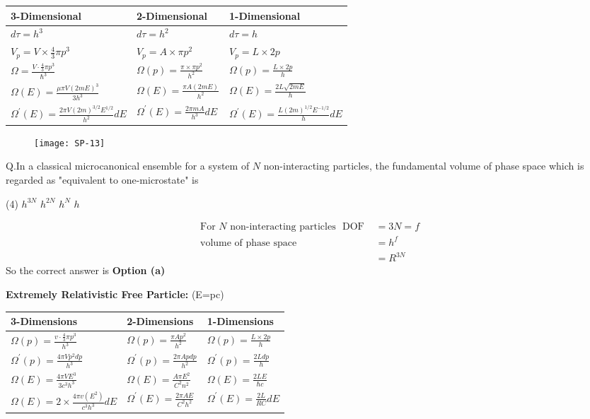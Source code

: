  \begin{tabular}{|p{4cm}|p{4cm}|p{4cm}|}
 	\hline
 3-Dimensional&2-Dimensional&1-Dimensional\\\hline
 $d \tau=h^{3}$&$d \tau=h^{2}$&$d \tau=h$\\\hline
 $V_{p}=V \times \frac{4}{3} \pi p^{3}$&$V_{p}=A \times \pi p^{2}$&$V_p=L\times2p$\\\hline
 $\Omega=\frac{V \cdot \frac{4}{3} \pi p^{3}}{\hbar^{3}}$&$\Omega(p)=\frac{\pi \times \pi p^{2}}{h^{2}}$&$\Omega(p)=\frac{L \times 2 p}{h}$\\\hline
 $\Omega(E)=\frac{\mu\pi V(2mE)^3}{3h^3}$&$\Omega(E)=\frac{\pi A(2mE)}{h^2}$&$\Omega(E)=\frac{2L\sqrt{2mE}}{h}$\\\hline
 $\Omega^{\prime}(E)=\frac{2 \pi V(2 m)^{3 / 2} E^{1 / 2}}{h^2}dE$&$\Omega^{\prime}(E)=\frac{2 \pi mA}{h^3}dE$&$\Omega^{\prime}(E)=\frac{L(2m)^{1/2}E^{-1/2}}{h}dE$\\\hline
 \end{tabular}
\begin{figure}[H]
	\texttt{[image: SP-13]}
\end{figure}
Q.In a classical microcanonical ensemble for a system of $N$ non-interacting particles, the fundamental volume of phase space which is regarded as "equivalent to one-microstate" is 
 \begin{tasks}(4)
	\task[\textbf{a.}] $h^{3 N}$
	\task[\textbf{b.}]$h^{2 N}$
	\task[\textbf{c.}]$h^{N}$
	\task[\textbf{d.}]$h$
\end{tasks}
\begin{answer}
	\begin{align*}
	\text{For $N$ non-interacting particles }\text { DOF }&=3 N=f\\
	\text{volume of phase space }&=h^{f}\\
	&=R^{3 N}
	\end{align*}
	So the correct answer is \textbf{Option (a)}
\end{answer}
\textbf{Extremely Relativistic Free Particle: }(E=pc)\\
\renewcommand*{\arraystretch}{1.8}
\begin{tabular}{|p{4cm}|p{4cm}|p{4cm}|}
	\hline
	3-Dimensions & 2-Dimensions & 1-Dimensions\\\hline
	$\Omega(p)=\frac{v \cdot \frac{4}{3} \pi p^{3}}{h^{3}}$&$\Omega(p)=\frac{\pi A p^{2}}{h^{2}}$&$\Omega(p)=\frac{L \times 2 p}{h}$\\
	$\Omega^{\prime}(p)=\frac{4 \pi V p^{2} d p}{h^{3}}$&$\Omega^{\prime}(p)=\frac{2 \pi A p d p}{h^{2}}$&$\Omega^{\prime}(p)=\frac{2 L d p}{h}$\\\hline
	$\Omega(E)=\frac{4 \pi V E^{3}}{3 c^{3} h^{3}}$&$\Omega(E)=\frac{A \pi E^{2}}{C^{2} n^{2}}$&$\Omega(E)=\frac{2 L E}{\hbar c}$\\
	$\Omega(E)=2 \times \frac{4 \pi v\left(E^{2}\right)}{c^{3} h^{3}} d E$&$\Omega^{\prime}(E)=\frac{2 \pi A E}{C^{2} h^{2}}$&$\Omega^{\prime}(E)=\frac{2 L}{R C} d E$\\\hline
\end{tabular}
